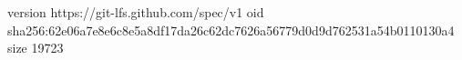 version https://git-lfs.github.com/spec/v1
oid sha256:62e06a7e8e6c8e5a8df17da26c62dc7626a56779d0d9d762531a54b0110130a4
size 19723
